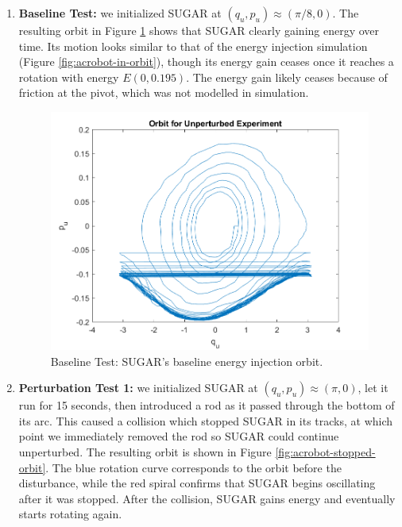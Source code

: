 \documentclass[journal,twoside,web, twocolumn,draftcls]{ieeecolor}
\begin{document}
\begin{enumerate}
    \item \textbf{Baseline Test:} 
    we initialized SUGAR at 
    \((q_u,p_u) \approx \left(\pi/8,0\right)\). 
    The resulting orbit in Figure \ref{fig:acrobot-unperturbed-orbit} shows
    that SUGAR clearly gaining energy over time.
    Its motion looks similar to that of the energy injection simulation (Figure
    \ref{fig:acrobot-in-orbit}), though its energy gain ceases once it reaches a
    rotation with energy \(E(0,0.195)\).
    The energy gain likely ceases because of friction at the pivot, which was
    not modelled in simulation.

\begin{figure}
    \centering
    \includegraphics[width=0.8\linewidth]{acrobot_unperturbed_orbit.png}
    \caption{Baseline Test: SUGAR's baseline energy injection orbit.}
    \label{fig:acrobot-unperturbed-orbit}
\end{figure}

\item \textbf{Perturbation Test 1:}
    we initialized SUGAR at 
    \((q_u,p_u) \approx \left(\pi,0\right)\), let it run for 15
    seconds, then introduced a rod as it passed through the bottom of
    its arc.
    This caused a collision which stopped SUGAR in its tracks, at which
    point we immediately removed the rod so SUGAR could continue
    unperturbed.
    The resulting orbit is shown in Figure \ref{fig:acrobot-stopped-orbit}.
    The blue rotation curve corresponds to the orbit before the disturbance,
    while the red spiral confirms that SUGAR begins oscillating after it
    was stopped.  
    After the collision, SUGAR gains energy and eventually starts
    rotating again.


\end{enumerate}
\end{document}
